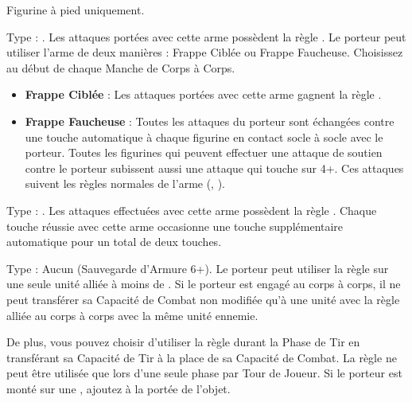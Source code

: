 \closearmynewsection








\startarmymagicalitems

\armymagicalweapons

\startpricelist

Figurine à pied uniquement.

 Type : \halberd{}. Les attaques portées avec cette arme possèdent la règle . Le porteur peut utiliser l'arme de deux manières : Frappe Ciblée ou Frappe Faucheuse. Choisissez au début de chaque Manche de Corps à Corps.
 \begin{itemize}[label={-}]
\item \textbf{Frappe Ciblée} : Les attaques portées avec cette arme gagnent la règle .
\item \textbf{Frappe Faucheuse} : Toutes les attaques du porteur sont échangées contre une touche automatique à chaque figurine en contact socle à socle avec le porteur. Toutes les figurines qui peuvent effectuer une attaque de soutien contre le porteur subissent aussi une attaque qui touche sur 4+. Ces attaques suivent les règles normales de l'arme (\halberd{}, ).
\end{itemize}

 Type : \hw{}. Les attaques effectuées avec cette arme possèdent la règle . Chaque touche réussie avec cette arme occasionne une touche supplémentaire automatique pour un total de deux touches.

\endpricelist

\armymagicalarmour

\startpricelist

 Type : Aucun (Sauvegarde d'Armure 6+). Le porteur peut utiliser la règle \undyingwill{} sur une seule unité alliée à moins de . Si le porteur est engagé au corps à corps, il ne peut transférer sa Capacité de Combat non modifiée qu'à une unité avec la règle \undead{} alliée au corps à corps avec la même unité ennemie.

De plus, vous pouvez choisir d'utiliser la règle \undyingwill{} durant la Phase de Tir en transférant sa Capacité de Tir à la place de sa Capacité de Combat. La règle \undyingwill{} ne peut être utilisée que lors d'une seule phase par Tour de Joueur. Si le porteur est monté sur une \largetarget{}, ajoutez  à la portée de l'objet.

